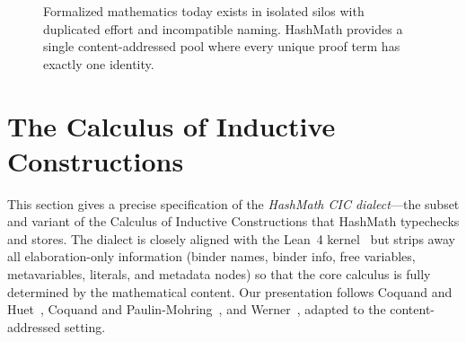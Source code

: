 \documentclass[11pt]{article}
\theoremstyle{definition}
\theoremstyle{plain}
\theoremstyle{remark}
\begin{document}
\begin{figure}[t]
\centering
{}
\caption{Formalized mathematics today exists in isolated silos with duplicated effort
and incompatible naming.
HashMath provides a single content-addressed pool where every unique proof term has
exactly one identity.}
\label{fig:silos}
\end{figure}


\section{The Calculus of Inductive Constructions}
\label{sec:cic}

This section gives a precise specification of the \emph{HashMath CIC dialect}---the
subset and variant of the Calculus of Inductive Constructions that HashMath typechecks
and stores.
The dialect is closely aligned with the Lean~4 kernel~\cite{lean4} but strips away
all elaboration-only information (binder names, binder info, free variables, metavariables,
literals, and metadata nodes) so that the core calculus is fully determined by the
mathematical content.
Our presentation follows Coquand and Huet~\cite{coquand1988}, Coquand and
Paulin-Mohring~\cite{coquand1990}, and Werner~\cite{werner1994}, adapted to the
content-addressed setting.
\end{document}
